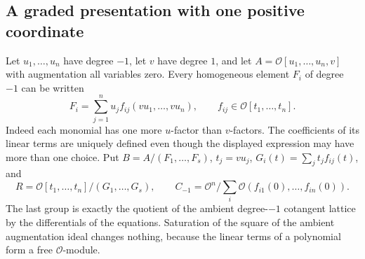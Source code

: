 \documentclass[a4paper,11pt]{article}
\theoremstyle{definition}
\theoremstyle{remark}
\numberwithin{equation}{section}
\newcommand{\OO}{\mathcal O}
\begin{document}
\subsection{A graded presentation with one positive coordinate}\label{nav:IV-04}
\label{sec:slice34}

Let \(u_1,\ldots,u_n\) have degree \(-1\), let \(v\) have degree \(1\), and let \(A=\OO[u_1,\ldots,u_n,v]\) with augmentation all variables zero. Every homogeneous element \(F_i\) of degree \(-1\) can be written
\[
 F_i=\sum_{j=1}^n u_j f_{ij}(v u_1,\ldots,v u_n),\qquad
                    f_{ij}\in\OO[t_1,\ldots,t_n].
\]
Indeed each monomial has one more \(u\)-factor than \(v\)-factors. The coefficients of its linear terms are uniquely defined even though the displayed expression may have more than one choice. Put \(B=A/(F_1,\ldots,F_s)\), \(t_j=v u_j\), \(G_i(t)=\sum_j t_j f_{ij}(t)\), and
\[
       R=\OO[t_1,\ldots,t_n]/(G_1,\ldots,G_s),\qquad
       C_{-1}=\OO^n / \sum_i \OO(f_{i1}(0),\ldots,f_{in}(0)).
\]
The last group is exactly the quotient of the ambient degree-\(-1\) cotangent lattice by the differentials of the equations. Saturation of the square of the ambient augmentation ideal changes nothing, because the linear terms of a polynomial form a free \(\OO\)-module.
\end{document}
